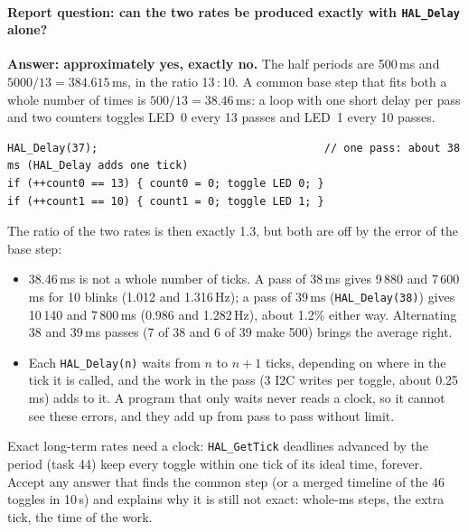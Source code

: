 \documentclass[11pt,a4paper]{article}
\begin{document}
\paragraph{Report question: can the two rates be produced exactly with \texttt{HAL\_Delay} alone?}
\textbf{Answer: approximately yes, exactly no.} The half periods are 500\,ms and $5000/13 = 384.615$\,ms, in the ratio
13\,:\,10. A common base step that fits both a whole number of times is $500/13 = 38.46$\,ms: a loop with one short
delay per pass and two counters toggles LED~0 every 13 passes and LED~1 every 10 passes.
\begin{lstlisting}
HAL_Delay(37);                                   // one pass: about 38 ms (HAL_Delay adds one tick)
if (++count0 == 13) { count0 = 0; toggle LED 0; }
if (++count1 == 10) { count1 = 0; toggle LED 1; }
\end{lstlisting}
The ratio of the two rates is then exactly 1.3, but both are off by the error of the base step:
\begin{itemize}
  \item 38.46\,ms is not a whole number of ticks. A pass of 38\,ms gives 9\,880 and 7\,600\,ms for 10 blinks (1.012 and
        1.316\,Hz); a pass of 39\,ms (\texttt{HAL\_Delay(38)}) gives 10\,140 and 7\,800\,ms (0.986 and 1.282\,Hz), about
        1.2\% either way. Alternating 38 and 39\,ms passes (7 of 38 and 6 of 39 make 500) brings the average right.
  \item Each \texttt{HAL\_Delay(n)} waits from $n$ to $n + 1$ ticks, depending on where in the tick it is called, and the
        work in the pass (3 I2C writes per toggle, about 0.25\,ms) adds to it. A program that only waits never reads a
        clock, so it cannot see these errors, and they add up from pass to pass without limit.
\end{itemize}
Exact long-term rates need a clock: \texttt{HAL\_GetTick} deadlines advanced by the period (task 44) keep every toggle
within one tick of its ideal time, forever. Accept any answer that finds the common step (or a merged timeline of the
46 toggles in 10\,s) and explains why it is still not exact: whole-ms steps, the extra tick, the time of the work.
\end{document}
